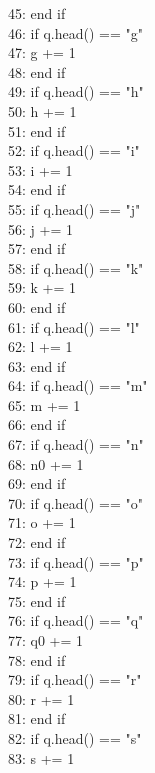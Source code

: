 \documentclass[a4paper]{book}
\theoremstyle{definition}
\begin{document}
{45: \indent end if \\
46: \indent if q.head() == "g" \\
47: \indent\indent g += 1 \\
48: \indent end if \\
49: \indent if q.head() == "h" \\
50: \indent\indent h += 1 \\
51: \indent end if \\
52: \indent if q.head() == "i" \\
53: \indent\indent i += 1 \\
54: \indent end if \\
55: \indent if q.head() == "j" \\
56: \indent\indent j += 1 \\
57: \indent end if \\
58: \indent if q.head() == "k" \\
59: \indent\indent k += 1 \\
60: \indent end if \\
61: \indent if q.head() == "l" \\
62: \indent\indent l += 1 \\
63: \indent end if \\
64: \indent if q.head() == "m" \\
65: \indent\indent m += 1 \\
66: \indent end if \\
67: \indent if q.head() == "n" \\
68: \indent\indent n0 += 1 \\
69: \indent end if \\
70: \indent if q.head() == "o" \\
71: \indent\indent o += 1 \\
72: \indent end if \\
73: \indent if q.head() == "p" \\
74: \indent\indent p += 1 \\
75: \indent end if \\
76: \indent if q.head() == "q" \\
77: \indent\indent q0 += 1 \\
78: \indent end if \\
79: \indent if q.head() == "r" \\
80: \indent\indent r += 1 \\
81: \indent end if \\
82: \indent if q.head() == "s" \\
83: \indent\indent s += 1 \\
}
\end{document}
